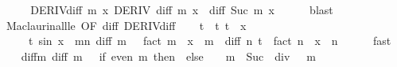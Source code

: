 \begin{isabellebody}
\ \ \isamarkupfalse%
\ \isamarkupfalse%
\ DERIV{\isacharunderscore}{\kern0pt}diff{\isacharcolon}{\kern0pt}\ {\isachardoublequoteopen}{\isasymforall}m\ x{\isachardot}{\kern0pt}\ DERIV\ {\isacharparenleft}{\kern0pt}{\isacharquery}{\kern0pt}diff\ m{\isacharparenright}{\kern0pt}\ x\ {\isacharcolon}{\kern0pt}{\isachargreater}{\kern0pt}\ {\isacharquery}{\kern0pt}diff\ {\isacharparenleft}{\kern0pt}Suc\ m{\isacharparenright}{\kern0pt}\ x{\isachardoublequoteclose}\isanewline
\ \ \ \ \isamarkupfalse%
\ blast\isanewline
\ \ \isamarkupfalse%
\ Maclaurin{\isacharunderscore}{\kern0pt}all{\isacharunderscore}{\kern0pt}le\ {\isacharbrackleft}{\kern0pt}OF\ diff{\isacharunderscore}{\kern0pt}{}\ DERIV{\isacharunderscore}{\kern0pt}diff{\isacharbrackright}{\kern0pt}\isanewline
\ \ \isamarkupfalse%
\ t\ \ t{}{\isacharcolon}{\kern0pt}\ {\isachardoublequoteopen}{\isasymbar}t{\isasymbar}\ {\isasymle}\ {\isasymbar}x{\isasymbar}{\isachardoublequoteclose}\isanewline
\ \ \ \ \ t{}{\isacharcolon}{\kern0pt}\ {\isachardoublequoteopen}sin\ x\ {\isacharequal}{\kern0pt}\ {\isacharparenleft}{\kern0pt}{\isasymSum}m{\isacharless}{\kern0pt}n{\isachardot}{\kern0pt}\ {\isacharquery}{\kern0pt}diff\ m\ {}\ {\isacharslash}{\kern0pt}\ {\isacharparenleft}{\kern0pt}fact\ m{\isacharparenright}{\kern0pt}\ {\isacharasterisk}{\kern0pt}\ x\ {\isacharcircum}{\kern0pt}\ m{\isacharparenright}{\kern0pt}\ {\isacharplus}{\kern0pt}\ {\isacharquery}{\kern0pt}diff\ n\ t\ {\isacharslash}{\kern0pt}\ {\isacharparenleft}{\kern0pt}fact\ n{\isacharparenright}{\kern0pt}\ {\isacharasterisk}{\kern0pt}\ x\ {\isacharcircum}{\kern0pt}\ n{\isachardoublequoteclose}\isanewline
\ \ \ \ \isamarkupfalse%
\ fast\isanewline
\ \ \isamarkupfalse%
\ diff{\isacharunderscore}{\kern0pt}m{\isacharunderscore}{\kern0pt}{}{\isacharcolon}{\kern0pt}\ {\isachardoublequoteopen}{\isacharquery}{\kern0pt}diff\ m\ {}\ {\isacharequal}{\kern0pt}\ {\isacharparenleft}{\kern0pt}if\ even\ m\ then\ {}\ else\ {\isacharparenleft}{\kern0pt}{\isacharminus}{\kern0pt}\ {}{\isacharparenright}{\kern0pt}\ {\isacharcircum}{\kern0pt}\ {\isacharparenleft}{\kern0pt}{\isacharparenleft}{\kern0pt}m\ {\isacharminus}{\kern0pt}\ Suc\ {}{\isacharparenright}{\kern0pt}\ div\ {}{\isacharparenright}{\kern0pt}{\isacharparenright}{\kern0pt}{\isachardoublequoteclose}\ \ m\isanewline
\ \ \ \ \isamarkupfalse%

\end{isabellebody}
